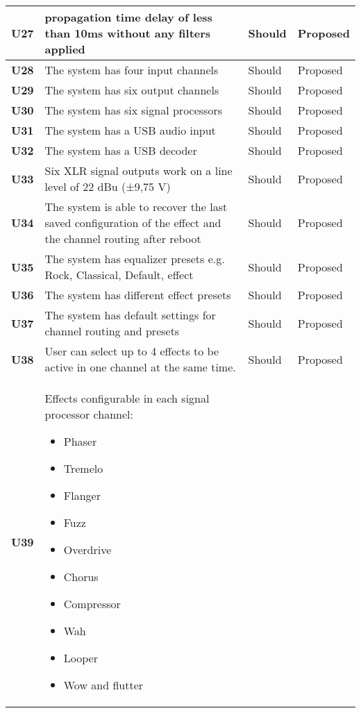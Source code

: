 \begin{longtable}{|l|p{10cm}|l|l|}
	\textbf{U27} &propagation time delay of less than 10ms without any filters applied 											& Should & Proposed\\ \hline
	\textbf{U28} &The system has four input channels 																			& Should & Proposed\\ \hline
	\textbf{U29} &The system has six output channels 																			& Should & Proposed\\ \hline
	\textbf{U30} &The system has six signal processors 																			& Should & Proposed\\ \hline
	\textbf{U31} &The system has a USB audio input					 															& Should & Proposed\\ \hline
	\textbf{U32} &The system has a USB decoder					 																& Should & Proposed\\ \hline
	\textbf{U33} &Six XLR signal outputs work on a line level of 22 dBu (±9,75 V) 												& Should & Proposed\\ \hline
	\textbf{U34} &The system is able to recover the last saved configuration of the effect and the channel routing after reboot	& Should & Proposed\\ \hline
	\textbf{U35} &The system has equalizer presets e.g. Rock, Classical, Default, effect		 								& Should & Proposed\\ \hline
	\textbf{U36} &The system has different effect presets										 								& Should & Proposed\\ \hline
	\textbf{U37} &The system has default settings for channel routing and presets							 					& Should & Proposed\\ \hline
	\textbf{U38} &User can select up to 4 effects to be active in one channel at the same time. 								& Should & Proposed\\ \hline
	\textbf{U39} &Effects configurable in each signal processor channel:\newline
	\begin{itemize}
		\setlength\itemsep{-0.3em}
		\item Phaser
		\item Tremelo
		\item Flanger
		\item Fuzz
		\item Overdrive
		\item Chorus
		\item Compressor
		\item Wah
		\item Looper
		\item Wow and flutter

\end{itemize}
\end{longtable}
